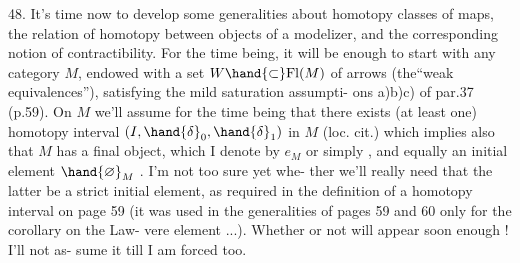 48. It's time now to develop some generalities about homotopy classes
of maps, the relation of homotopy between objects of a modelizer, and the%
corresponding notion of contractibility. For the time being, it will be
enough to start with any category $M$, endowed with a set $W \hand{\subset} \mathrm{Fl}(M)$ of
arrows (the``weak equivalences''), satisfying the mild saturation assumpti-%
ons a)b)c) of par.37 (p.59). On $M$ we'll assume for the time being that
there exists (at least one) homotopy interval $(I,\hand{\delta}_0,\hand{\delta}_1)$ in $M$ (loc. cit.)
which implies also that $M$ has a final object, which I denote by $e_M$ or
simply  , and equally an initial element $\hand{\varnothing}_M$ . I'm not too sure yet whe-%
ther we'll really need that the latter be a strict initial element, as
required in the definition of a homotopy interval on page 59 (it was used
in the generalities of pages 59 and 60 only for the corollary on the Law-%
vere element ...). Whether or not will appear soon enough ! I'll not as-%
sume it till I am forced too. 
